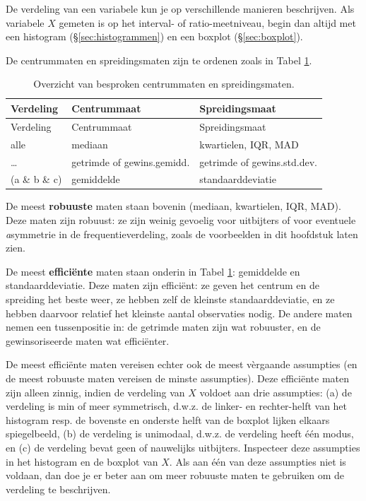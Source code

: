 \documentclass[
]{book}
\begin{document}
De verdeling van een variabele kun je op verschillende manieren
beschrijven.
Als variabele \(X\) gemeten is op het interval- of ratio-meetniveau,
begin dan altijd met een histogram (§\ref{sec:histogrammen})
en een boxplot (§\ref{sec:boxplot}).

De centrummaten en spreidingsmaten zijn te ordenen zoals in
Tabel \ref{tab:centrumspreidingsmaten}.

\begin{longtable}[]{@{}lll@{}}
\caption{\label{tab:centrumspreidingsmaten} Overzicht van besproken centrummaten en spreidingsmaten.}\tabularnewline
\toprule
Verdeling & Centrummaat & Spreidingsmaat\tabularnewline
\midrule
\endfirsthead
\toprule
Verdeling & Centrummaat & Spreidingsmaat\tabularnewline
\midrule
\endhead
alle & mediaan & kwartielen, IQR, MAD\tabularnewline
\ldots{} & getrimde of gewins.gemidd. & getrimde of gewins.std.dev.\tabularnewline
(a \& b \& c) & gemiddelde & standaarddeviatie\tabularnewline
\bottomrule
\end{longtable}

De meest \textbf{robuuste} maten staan
bovenin (mediaan, kwartielen, IQR, MAD). Deze maten zijn robuust: ze
zijn weinig gevoelig voor uitbijters of voor eventuele \emph{a}symmetrie in de
frequentieverdeling, zoals de voorbeelden in dit hoofdstuk laten zien.

De meest \textbf{efficiënte} maten staan onderin in
Tabel \ref{tab:centrumspreidingsmaten}: gemiddelde en standaarddeviatie.
Deze maten zijn efficiënt: ze geven het centrum en de spreiding het
beste weer, ze hebben zelf de kleinste standaarddeviatie, en ze hebben
daarvoor relatief het kleinste aantal observaties nodig. De andere maten
nemen een tussenpositie in: de getrimde maten zijn wat robuuster, en de
gewinsoriseerde maten wat efficiënter.

De meest efficiënte maten vereisen echter ook de meest vèrgaande
assumpties (en de meest robuuste maten vereisen de minste assumpties).
Deze efficiënte maten zijn alleen zinnig, indien de verdeling van \(X\)
voldoet aan drie assumpties: (a) de verdeling is min of meer
symmetrisch, d.w.z. de linker- en rechter-helft van het histogram resp.
de bovenste en onderste helft van de boxplot lijken elkaars
spiegelbeeld, (b) de verdeling is unimodaal, d.w.z. de verdeling heeft
één modus, en (c) de verdeling bevat geen of nauwelijks uitbijters.
Inspecteer deze assumpties in het histogram en de boxplot van \(X\). Als
aan één van deze assumpties niet is voldaan, dan doe je er beter aan om
meer robuuste maten te gebruiken om de verdeling te beschrijven.
\end{document}
